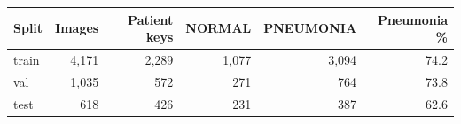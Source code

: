 \begin{tabular}{lrrrrr}
\toprule
Split & Images & Patient keys & NORMAL & PNEUMONIA & Pneumonia \% \\
\midrule
train & 4,171 & 2,289 & 1,077 & 3,094 & 74.2 \\
val & 1,035 & 572 & 271 & 764 & 73.8 \\
test & 618 & 426 & 231 & 387 & 62.6 \\
\bottomrule
\end{tabular}
